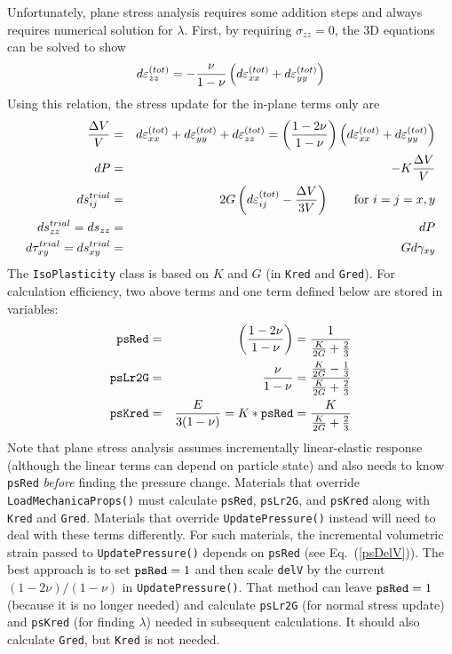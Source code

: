 \documentclass[11pt]{book}
\def\code#1{{\small\tt #1}}
\def\s#1{\sigma_{#1}}
\begin{document}
Unfortunately, plane stress analysis requires some addition steps and always requires numerical solution for $\lambda$. First, by requiring $\s{zz}=0$, the 3D equations can be solved to show
\begin{equation}
         d\varepsilon_{zz}^{(tot)} = - {\nu\over 1-\nu}\left(d\varepsilon_{xx}^{(tot)} + d\varepsilon_{yy}^{(tot)}\right)
\end{equation}
Using this relation, the stress update for the in-plane terms only are
\begin{eqnarray}
       {\Delta V\over V} & = & d\varepsilon_{xx}^{(tot)} + d\varepsilon_{yy}^{(tot)} + d\varepsilon_{zz}^{(tot)}
                             = \left(1-2\nu\over 1-\nu\right)\left(d\varepsilon_{xx}^{(tot)} + d\varepsilon_{yy}^{(tot)}\right)      \label{psDelV} \\
       dP & = & -K {\Delta V\over V} \\
       ds_{ij}^{trial} & = & 2G \left(d\varepsilon_{ij}^{(tot)} - {\Delta V\over 3V}\right)   \qquad {\rm for\ }i=j=x,y \\
       ds_{zz}^{trial} = ds_{zz} & = & dP \\
       d\tau_{xy}^{trial} = ds_{xy}^{trial} & = & G d\gamma_{xy} \\
\end{eqnarray}
The \code{IsoPlasticity} class is based on $K$ and $G$ (in \code{Kred} and \code{Gred}). For calculation efficiency, two above terms and one term defined below are stored in variables:
\begin{eqnarray}
       \code{psRed} & = & \left(1-2\nu\over 1-\nu\right) = {1 \over {K\over 2G} + {2\over 3}} \\
       \code{psLr2G} & = & {\nu\over 1-\nu} ={{K\over 2G} - {1\over 3} \over {K\over 2G} + {2\over 3}} \\
       \code{psKred} & = & {E\over 3(1-\nu)} = K*\code{psRed} = {K \over {K\over 2G} + {2\over 3}}
\end{eqnarray}
Note that plane stress analysis assumes incrementally linear-elastic response (although the linear terms can depend on particle state) and also needs to know \code{psRed}  \emph{before} finding the pressure change. Materials that override \code{LoadMechanicaProps()} must calculate \code{psRed}, \code{psLr2G}, and \code{psKred} along with \code{Kred} and \code{Gred}. Materials that override \code{UpdatePressure()} instead will need to deal with these terms differently. For such materials, the incremental volumetric strain passed to \code{UpdatePressure()} depends on \code{psRed} (see Eq.~(\ref{psDelV})). The best approach is to set $\code{psRed}=1$ and then scale \code{delV} by the current $(1-2\nu)/(1-\nu)$ in \code{UpdatePressure()}. That method can leave $\code{psRed}=1$ (because it is no longer needed) and calculate \code{psLr2G} (for normal stress update) and \code{psKred} (for finding $\lambda$) needed in subsequent calculations. It should also calculate \code{Gred}, but \code{Kred} is not needed.
\end{document}
